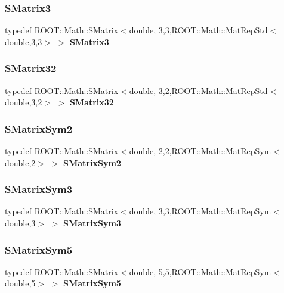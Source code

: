 \mbox{\label{Driver_8cc_a4c074de1d3d1ffc03c36f9eea63b1888}} 
\subsubsection{S\+Matrix3}
{\footnotesize\ttfamily typedef R\+O\+O\+T\+::\+Math\+::\+S\+Matrix$<$double, 3,3,R\+O\+O\+T\+::\+Math\+::\+Mat\+Rep\+Std$<$double,3,3$>$ $>$ \textbf{ S\+Matrix3}}

\mbox{\label{Driver_8cc_ac072a901e12523f5b9012ad009f30875}} 
\subsubsection{S\+Matrix32}
{\footnotesize\ttfamily typedef R\+O\+O\+T\+::\+Math\+::\+S\+Matrix$<$double, 3,2,R\+O\+O\+T\+::\+Math\+::\+Mat\+Rep\+Std$<$double,3,2$>$ $>$ \textbf{ S\+Matrix32}}

\mbox{\label{Driver_8cc_a47f453899a4cc9c991e80599de3e4eb9}} 
\subsubsection{S\+Matrix\+Sym2}
{\footnotesize\ttfamily typedef R\+O\+O\+T\+::\+Math\+::\+S\+Matrix$<$double, 2,2,R\+O\+O\+T\+::\+Math\+::\+Mat\+Rep\+Sym$<$double,2$>$ $>$ \textbf{ S\+Matrix\+Sym2}}

\mbox{\label{Driver_8cc_a4dd68b11189b8986560a75010c66d92d}} 
\subsubsection{S\+Matrix\+Sym3}
{\footnotesize\ttfamily typedef R\+O\+O\+T\+::\+Math\+::\+S\+Matrix$<$double, 3,3,R\+O\+O\+T\+::\+Math\+::\+Mat\+Rep\+Sym$<$double,3$>$ $>$ \textbf{ S\+Matrix\+Sym3}}

\mbox{\label{Driver_8cc_ad4e885cf8223404f17d53a9824ae5677}} 
\subsubsection{S\+Matrix\+Sym5}
{\footnotesize\ttfamily typedef R\+O\+O\+T\+::\+Math\+::\+S\+Matrix$<$double, 5,5,R\+O\+O\+T\+::\+Math\+::\+Mat\+Rep\+Sym$<$double,5$>$ $>$ \textbf{ S\+Matrix\+Sym5}}

